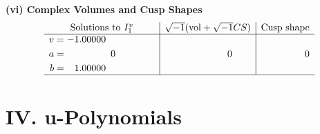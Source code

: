 \documentclass[1p]{elsarticle_modified}
\theoremstyle{definition}
\newcommand{\I}{\sqrt{-1}}
\begin{document}
\newpage\flushleft \textbf{(vi) Complex Volumes and Cusp Shapes}
$$\begin{array}{c|c|c}  
\text{Solutions to }I^v_{1}& \I (\text{vol} + \sqrt{-1}CS) & \text{Cusp shape}\\
 \hline 
\begin{aligned}
v &= -1.00000\phantom{ +0.000000I} \\
a &= \phantom{-0.000000 } 0 \\
b &= \phantom{-}1.00000\phantom{ +0.000000I}\end{aligned}
 & \phantom{-0.000000 } 0 & \phantom{-0.000000 } 0\\
 \hline 
 \end{array}$$\newpage
\newpage\renewcommand{\arraystretch}{1}
\centering \section*{ IV. u-Polynomials}
\end{document}
